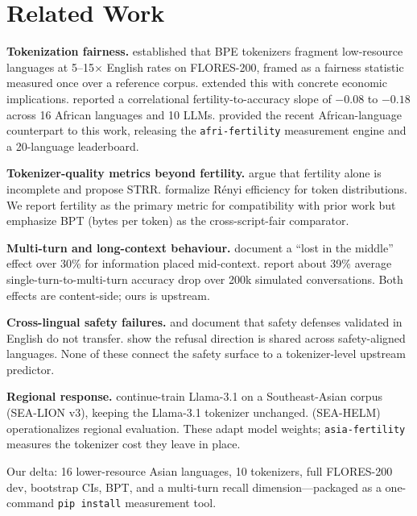\documentclass[11pt,a4paper]{article}
\begin{document}
\section{Related Work}
\label{sec:related}

\textbf{Tokenization fairness.} \citet{petrov2023language} established that BPE tokenizers fragment low-resource languages at 5--15$\times$ English rates on FLORES-200, framed as a fairness statistic measured once over a reference corpus. \citet{ahia2023} extended this with concrete economic implications. \citet{lundin2025token} reported a correlational fertility-to-accuracy slope of $-0.08$ to $-0.18$ across 16 African languages and 10 LLMs. \citet{somide2026african} provided the recent African-language counterpart to this work, releasing the \texttt{afri-fertility} measurement engine and a 20-language leaderboard.

\textbf{Tokenizer-quality metrics beyond fertility.} \citet{nayeem2025beyond} argue that fertility alone is incomplete and propose STRR. \citet{zouhar2023tokenization} formalize R\'enyi efficiency for token distributions. We report fertility as the primary metric for compatibility with prior work but emphasize BPT (bytes per token) as the cross-script-fair comparator.

\textbf{Multi-turn and long-context behaviour.} \citet{liu2023lost} document a ``lost in the middle'' effect over 30\% for information placed mid-context. \citet{laban2025lostmulti} report about 39\% average single-turn-to-multi-turn accuracy drop over 200k simulated conversations. Both effects are content-side; ours is upstream.

\textbf{Cross-lingual safety failures.} \citet{yong2023low} and \citet{wang2023all} document that safety defenses validated in English do not transfer. \citet{chen2025refusal} show the refusal direction is shared across safety-aligned languages. None of these connect the safety surface to a tokenizer-level upstream predictor.

\textbf{Regional response.} \citet{ng2025sealion} continue-train Llama-3.1 on a Southeast-Asian corpus (SEA-LION v3), keeping the Llama-3.1 tokenizer unchanged. \citet{susanto2025seahelm} (SEA-HELM) operationalizes regional evaluation. These adapt model weights; \texttt{asia-fertility} measures the tokenizer cost they leave in place.

Our delta: 16 lower-resource Asian languages, 10 tokenizers, full FLORES-200 dev, bootstrap CIs, BPT, and a multi-turn recall dimension---packaged as a one-command \texttt{pip install} measurement tool.
\end{document}
